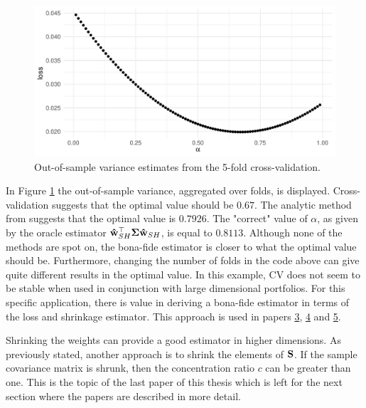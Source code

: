 \documentclass[12pt, oneside]{book}\usepackage{knitr}
\begin{document}
\begin{knitrout}\small
{}\color{fgcolor}\begin{figure}

{\centering \includegraphics[width=\maxwidth]{figure/cv_benchmark-1} 

}

\caption[Out-of-sample variance estimates from the 5-fold cross-validation]{Out-of-sample variance estimates from the 5-fold cross-validation.}\label{fig:cv_benchmark}
\end{figure}

\end{knitrout}

In Figure \ref{fig:cv_benchmark} the out-of-sample variance, aggregated over folds, is displayed. 
Cross-validation suggests that the optimal value should be $0.67$. 
The analytic method from \citet{bodnar2018estimation} suggests that the optimal value is $0.7926$.
The "correct" value of $\alpha$, as given by the oracle estimator $\mathbf{\hat{w}}_{SH}^\top\mathbf{\Sigma} \mathbf{\hat{w}}_{SH}$, is equal to $0.8113$. 
Although none of the methods are spot on, the bona-fide estimator is closer to what the optimal value should be.
Furthermore, changing the number of folds in the code above can give quite different results in the optimal value.
In this example, CV does not seem to be stable when used in conjunction with large dimensional portfolios.
For this specific application, there is value in deriving a bona-fide estimator in terms of the loss and shrinkage estimator.
This approach is used in papers \hyperref[sec:paper3]{3}, \hyperref[sec:paper4]{4} and \hyperref[sec:paper5]{5}.

Shrinking the weights can provide a good estimator in higher dimensions. 
As previously stated, another approach is to shrink the elements of $\mathbf{S}$.
If the sample covariance matrix is shrunk, then the concentration ratio $c$ can be greater than one.
This is the topic of the last paper of this thesis which is left for the next section where the papers are described in more detail.
\end{document}
